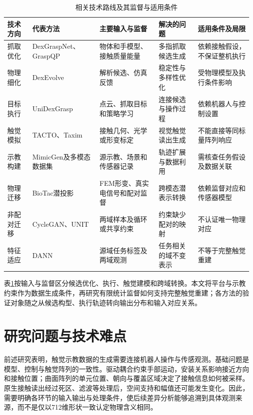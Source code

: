 \begin{table}[htbp]
  \centering
  \caption{相关技术路线及其监督与适用条件}
  \label{tab:related_work_routes}
  \begingroup
  \setlength{\tabcolsep}{3pt}
  \begin{tabularx}{\textwidth}{p{}p{}XXX}
    \toprule
    技术方向 & 代表方法 & 主要输入与监督 & 解决的问题 & 适用条件及局限 \\
    \midrule
    抓取优化 & DexGraspNet、GraspQP & 物体和手模型、接触质量能量 & 多指抓取候选生成 & 依赖接触假设，不保证整机执行 \\
    物理细化 & DexEvolve & 解析候选、仿真反馈 & 稳定性与多样性优化 & 受物理模型及执行条件影响 \\
    目标执行 & UniDexGrasp & 点云、抓取目标和策略学习 & 连接候选与操作过程 & 依赖机器人与控制设置 \\
    触觉模拟 & TACTO、Taxim & 接触几何、光学或形变标定 & 视觉触觉读出生成 & 不能直接等同标量阵列响应 \\
    示教构建 & MimicGen及多模态数据集 & 源示教、场景和传感器记录 & 轨迹扩展与数据利用 & 需核查任务假设及数据关联 \\
    物理迁移 & BioTac潜投影\cite{narang2021latentprojections} & FEM形变、真实电信号和配对监督 & 跨模态潜表示转换 & 依赖监督对应和传感器模型 \\
    非配对迁移 & CycleGAN、UNIT & 两域样本及循环或共享约束 & 约束缺少配对的映射 & 不认证唯一物理对应 \\
    特征适应 & DANN & 源域任务标签及两域观测 & 任务相关的域不变表示 & 不等于完整触觉重建 \\
    \bottomrule
  \end{tabularx}
  \endgroup
\end{table}

表\ref{tab:related_work_routes}按输入与监督区分候选优化、执行、触觉建模和跨域转换。本文将平台与示教约束作为数据生成条件，再研究有限统计监督如何支持完整触觉重建；各方法的验证对象随之从候选构型、执行轨迹转向输出分布和输入对应关系。

\section{研究问题与技术难点}
\label{sec:research_problems}

前述研究表明，触觉示教数据的生成需要连接机器人操作与传感观测。基础问题是模型、控制与触觉阵列的一致性。驱动耦合约束手部运动，安装关系影响接近方向和接触位置；曲面阵列的单元位置、朝向与覆盖区域决定了接触信息如何被采样。原生接触读出经过死区、滤波等处理后，空间支持和幅值还可能发生变化。因此，需要明确各环节的输入输出与处理条件，使后续差异分析能够追溯到具体观测来源，而不是仅以712维形状一致认定物理含义相同。

